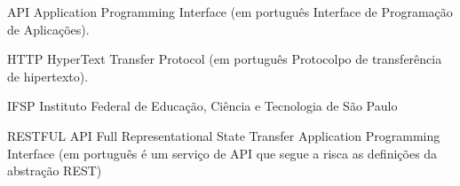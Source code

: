 \begin{siglas}
  \item{API} Application Programming Interface (em português Interface de Programação de Aplicações).
  \item{HTTP} HyperText Transfer Protocol (em português Protocolpo de transferência de hipertexto).
  \item{IFSP} Instituto Federal de Educação, Ciência e Tecnologia de São Paulo
  \item{RESTFUL API} Full Representational State Transfer Application Programming Interface (em português é um serviço de API que segue a risca as definições da abstração REST)
\end{siglas}
